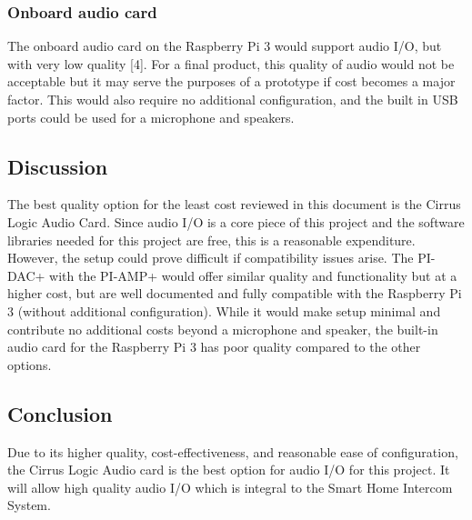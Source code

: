 \documentclass[onecolumn, draftclsnofoot,10pt, compsoc]{IEEEtran}
\begin{document}
\subsubsection{Onboard audio card}
The onboard audio card on the Raspberry Pi 3 would support audio I/O, but with very low quality [4]. For a final product, this quality of audio would not be acceptable but it may serve the purposes of a prototype if cost becomes a major factor. This would also require no additional configuration, and the built in USB ports could be used for a microphone and speakers. 

\subsection{Discussion}
The best quality option for the least cost reviewed in this document is the Cirrus Logic Audio Card. Since audio I/O is a core piece of this project and the software libraries needed for this project are free, this is a reasonable expenditure. However, the setup could prove difficult if compatibility issues arise. The PI-DAC+ with the PI-AMP+ would offer similar quality and functionality but at a higher cost, but are well documented and fully compatible with the Raspberry Pi 3 (without additional configuration). While it would make setup minimal and contribute no additional costs beyond a microphone and speaker, the built-in audio card for the Raspberry Pi 3 has poor quality compared to the other options. 

\subsection{Conclusion}
Due to its higher quality, cost-effectiveness, and reasonable ease of configuration, the Cirrus Logic Audio card is the best option for audio I/O for this project. It will allow high quality audio I/O which is integral to the Smart Home Intercom System.
\end{document}
